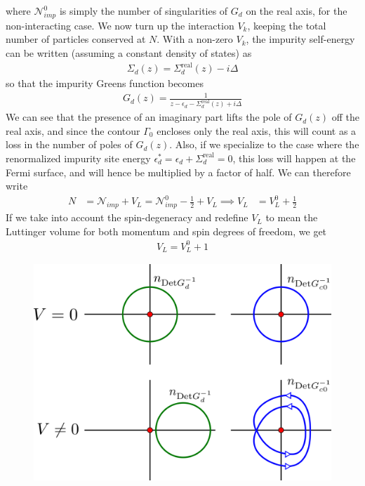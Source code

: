 \documentclass{report}
\numberwithin{equation}{section}
\begin{document}
where \(\mathcal{N}^0_{imp}\) is simply the number of singularities of \(G_d\) on the real axis, for the non-interacting case. We now turn up the interaction \(V_k\), keeping the total number of particles conserved at \(N\). With a non-zero \(V_k\), the impurity self-energy can be written (assuming a constant density of states) as
\begin{equation}\begin{aligned}
	\Sigma_d(z) = \Sigma_d^\text{real}(z) - i \Delta
\end{aligned}\end{equation}
so that the impurity Greens function becomes
\begin{equation}\begin{aligned}
	G_d(z) = \frac{1}{z - \epsilon_d - \Sigma_d^\text{real}(z) + i \Delta}
\end{aligned}\end{equation}
We can see that the presence of an imaginary part lifts the pole of \(G_d(z)\) off the real axis, and since the contour \(\Gamma_0\) encloses only the real axis, this will count as a loss in the number of poles of \(G_d(z)\). Also, if we specialize to the case where the renormalized impurity site energy \(\epsilon_d^* = \epsilon_d + \Sigma_d^\text{real} = 0\), this loss will happen at the Fermi surface, and will hence be multiplied by a factor of half. We can therefore write
\begin{equation}\begin{aligned}
	N &= \mathcal{N}_{imp} + V_L = \mathcal{N}^0_{imp} - \frac{1}{2} + V_L \implies V_L &= V_L^0 + \frac{1}{2}
\end{aligned}\end{equation}
If we take into account the spin-degeneracy and redefine \(V_L\) to mean the Luttinger volume for both momentum and spin degrees of freedom, we get
\begin{equation}\begin{aligned}
	\label{luttinger_change}
	V_L = V_L^0 + 1
\end{aligned}\end{equation}
\begin{figure}[htpb]
	\centering
	\includegraphics[scale=0.2]{../figures/luttinger_top_change.png}
\end{figure}
\end{document}
